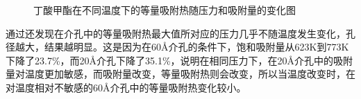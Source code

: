 \begin{figure}[H]
    \caption{丁酸甲酯在不同温度下的等量吸附热随压力和吸附量的变化图}
    \label{fig:sH2}
\end{figure}
\par{通过还发现在介孔中的等量吸附热最大值所对应的压力几乎不随温度发生变化，孔径越大，结果越明显。这是因为在60Å介孔的条件下，饱和吸附量从623K到773K下降了23.7\%，而20Å介孔下降了35.1\%，说明在相同压力下，在20Å介孔中的吸附量对温度更加敏感，而吸附量改变，等量吸附热则会改变，所以当温度改变时，在对温度相对不敏感的60Å介孔中的等量吸附热变化较小。}



